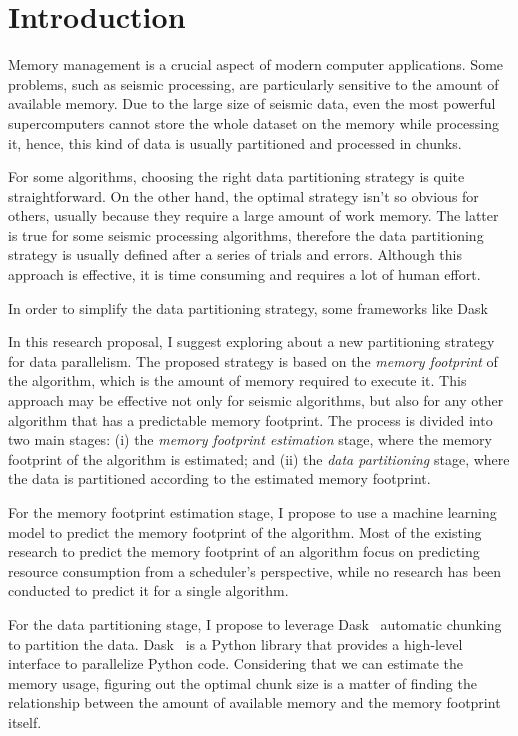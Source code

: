 \section{Introduction}
\label{sec:introduction}

Memory management is a crucial aspect of modern computer applications.
Some problems, such as seismic processing, are particularly sensitive to the amount of available memory.
Due to the large size of seismic data, even the most powerful supercomputers cannot store the whole dataset on the memory while processing it, hence, this kind of data is usually partitioned and processed in chunks.

For some algorithms, choosing the right data partitioning strategy is quite straightforward.
On the other hand, the optimal strategy isn't so obvious for others, usually because they require a large amount of work memory.
The latter is true for some seismic processing algorithms, therefore the data partitioning strategy is usually defined after a series of trials and errors.
Although this approach is effective, it is time consuming and requires a lot of human effort.

In order to simplify the data partitioning strategy, some frameworks like Dask~\cite{dask} 

In this research proposal, I suggest exploring about a new partitioning strategy for data parallelism.
The proposed strategy is based on the \emph{memory footprint} of the algorithm, which is the amount of memory required to execute it.
This approach may be effective not only for seismic algorithms, but also for any other algorithm that has a predictable memory footprint.
The process is divided into two main stages:
(i) the \emph{memory footprint estimation} stage, where the memory footprint of the algorithm is estimated; and
(ii) the \emph{data partitioning} stage, where the data is partitioned according to the estimated memory footprint.

For the memory footprint estimation stage, I propose to use a machine learning model to predict the memory footprint of the algorithm.
Most of the existing research to predict the memory footprint of an algorithm focus on predicting resource consumption from a scheduler's perspective, while no research has been conducted to predict it for a single algorithm.

For the data partitioning stage, I propose to leverage Dask~\cite{dask} automatic chunking to partition the data.
Dask~\cite{dask} is a Python library that provides a high-level interface to parallelize Python code.
Considering that we can estimate the memory usage, figuring out the optimal chunk size is a matter of finding the relationship between the amount of available memory and the memory footprint itself.

